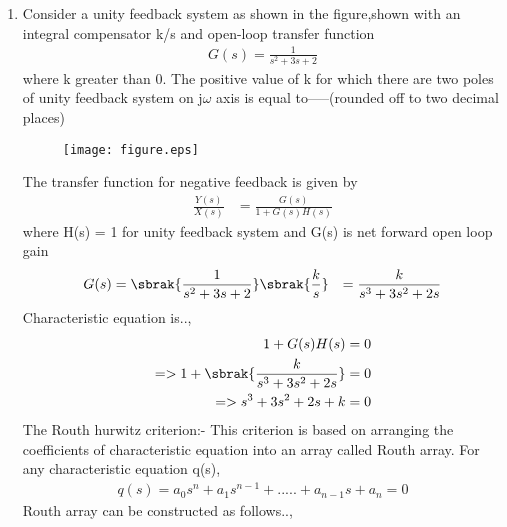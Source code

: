 \begin{enumerate}[label=\thesubsection.\arabic*.,ref=\thesubsection.\theenumi]
\end{enumerate}\begin{enumerate}[label=\thesection.\arabic*.,ref=\thesection.\theenumi]

\item
Consider a unity feedback system as shown in the figure,shown with an integral compensator k/s and open-loop transfer function
\begin{align}
G(s) = \frac{1}{s^2+3s+2}
\end{align}
where k greater than 0. The positive value of k for which there are two poles of unity feedback system on j${\omega}$ axis is equal to-----(rounded off to two decimal places)
\begin{figure}
\centering
\texttt{[image: figure.eps]}
\end{figure}
\solution The transfer function for negative feedback is given by
\begin{align}
\frac{Y(s)}{X(s)} &= \frac{G(s)}{1+G(s)H(s)}
\end{align}
where H(s) = 1 for unity feedback system
and G(s) is net forward open loop gain
\begin{align}
G(s) &=  \sbrak{\frac{1}{s^2+3s+2}}\sbrak{\frac{k}{s}}
&= \frac{k}{s^3+3s^2+2s}
\end{align}
Characteristic equation is..,
\begin{align}
 1 + G(s)H(s) = 0 \label{eq:sec_order_op}
\\
=> 1 + \sbrak{\frac{k}{s^3+3s^2+2s}} = 0
\\
=> s^3+3s^2+2s+k = 0
\end{align}
The Routh hurwitz criterion:-
This criterion is based on arranging the coefficients of characteristic equation into an array called Routh array.
For any characteristic equation q(s),
\begin{multline}
q(s) = a_0s^n+a_1s^{n-1}+.....+a_{n-1}s+a_n = 0
\end{multline}
Routh array can be constructed as follows..,
 

\end{enumerate}
